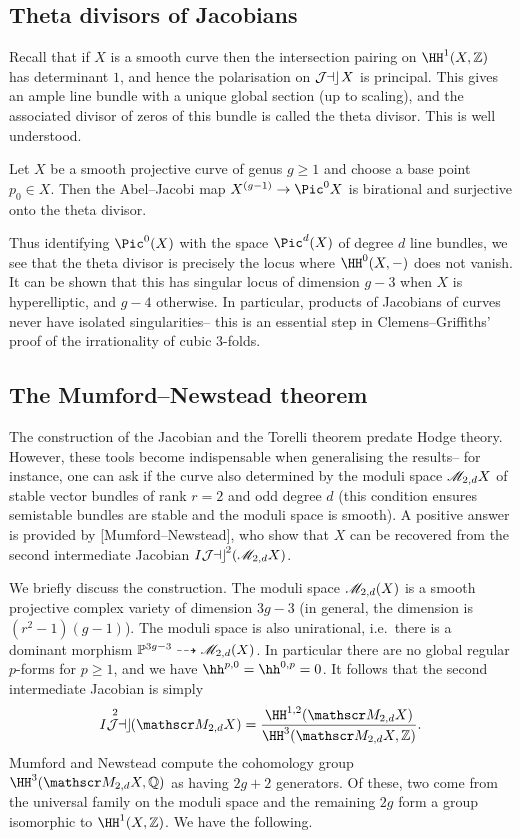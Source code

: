 \subsection{Theta divisors of Jacobians} Recall that if \(X\) is a smooth curve
then the intersection pairing on \(\HH^1(X,\mathbb{Z})\) has determinant \(1\),
and hence the polarisation on \(\mathop{\mathcal{J\kern -0.5pt a\kern -0.5pt c\kern -1pt}} X\) is principal. This gives an ample line
bundle with a unique global section (up to scaling), and the associated divisor
of zeros of this bundle is called the theta divisor. This is well understood.

\begin{theorem}
    Let \(X\) be a smooth projective curve of genus \(g\geq 1\) and choose a base
    point \(p_0\in X\). Then the Abel--Jacobi map \(X^{(g-1)}\to \Pic^0X\) is
    birational and surjective onto the theta divisor.
\end{theorem}

Thus identifying \(\Pic^0(X)\) with the space \(\Pic^d(X)\) of degree \(d\)
line bundles, we see that the theta divisor is precisely the locus where
\(\HH^0(X,-)\) does not vanish. It can be shown that this has singular locus of
dimension \(g-3\) when \(X\) is hyperelliptic, and \(g-4\) otherwise. In
particular, products of Jacobians of curves never have isolated singularities--
this is an essential step in Clemens--Griffiths' proof of the irrationality of
cubic 3-folds.


\subsection{The Mumford--Newstead theorem} The construction of the Jacobian and
the Torelli theorem predate Hodge theory. However, these tools become
indispensable when generalising the results-- for instance, one can ask if the
curve also determined by the moduli space \(\mathscr{M}_{2,d}X\) of stable vector
bundles of rank \(r=2\) and odd degree \(d\) (this condition ensures semistable
bundles are stable and the moduli space is smooth). A positive answer is
provided by [Mumford--Newstead], who show that \(X\) can be recovered from the
second intermediate Jacobian \(\mathop{I\mathcal{J\kern -0.5pt a\kern -0.5pt c\kern -1pt}}^2(\mathscr{M}_{2,d}X)\).

We briefly discuss the construction. The moduli space
\(\mathscr{M}_{2,d}(X)\) is a smooth projective complex variety of dimension
\(3g-3\) (in general, the dimension is \((r^2-1)(g-1)\)). The moduli space is also unirational, i.e.\ there is a dominant morphism
\(\mathbb{P}^{3g-3}\dashrightarrow\mathscr{M}_{2,d}(X)\). In particular there are no
global regular \(p\)-forms for \(p\geq 1\), and we have
\(\hh^{p,0}=\hh^{0,p}=0\). It follows that the second intermediate Jacobian is
simply
\[\IJac^2(\Moduli_{2,d}X)=\frac{\HH^{1,2}(\Moduli_{2,d}X)}{\HH^3(\Moduli_{2,d}X,\mathbb{Z})}.\]
Mumford and Newstead compute the cohomology group
\(\HH^3(\Moduli_{2,d}X,\mathbb{Q})\) as having \(2g+2\) generators. Of
these, two come from the universal family on the moduli space and the remaining
\(2g\) form a group isomorphic to \(\HH^1(X,\mathbb{Z})\). We have the following.

